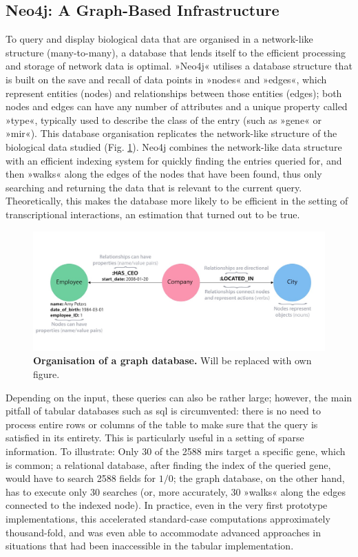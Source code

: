 \subsection{Neo4j: A Graph-Based Infrastructure}
To query and display biological data that are organised in a network-like structure (many-to-many), a database that lends itself to the efficient processing and storage of network data is optimal. »Neo4j« utilises a database structure that is built on the save and recall of data points in »nodes« and »edges«, which represent entities (nodes) and relationships between those entities (edges); both nodes and edges can have any number of attributes and a unique property called »type«, typically used to describe the class of the entry (such as »gene« or »\ac{mir}«). This database organisation replicates the network-like structure of the biological data studied (Fig. \ref{fig:db}). Neo4j combines the network-like data structure with an efficient indexing system for quickly finding the entries queried for, and then »walks« along the edges of the nodes that have been found, thus only searching and returning the data that is relevant to the current query. Theoretically, this makes the database more likely to be efficient in the setting of transcriptional interactions, an estimation that turned out to be true.

\begin{figure}
\includegraphics[width=\textwidth]{figures/db}
\caption[Graph database organisation.]{\textbf{Organisation of a graph database.} Will be replaced with own figure.
\label{fig:db}}
\end{figure}

Depending on the input, these queries can also be rather large; however, the main pitfall of tabular databases such as \ac{sql} is circumvented: there is no need to process entire rows or columns of the table to make sure that the query is satisfied in its entirety. This is particularly useful in a setting of sparse information. To illustrate: Only 30 of the 2588 \acp{mir} target a specific gene, which is common; a relational database, after finding the index of the queried gene, would have to search 2588 fields for $1/0$; the graph database, on the other hand, has to execute only 30 searches (or, more accurately, 30 »walks« along the edges connected to the indexed node). In practice, even in the very first prototype implementations, this accelerated standard-case computations approximately thousand-fold, and was even able to accommodate advanced approaches in situations that had been inaccessible in the tabular implementation.


